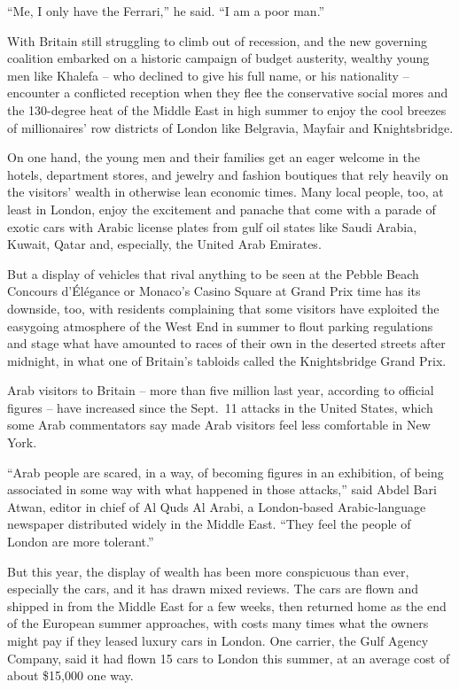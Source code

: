 ﻿\documentclass[12pt]{article}
\begin{document}
``Me, I only have the Ferrari,'' he said. ``I am a poor man.''

With Britain still struggling to climb out of recession, and the new governing coalition embarked on
a historic campaign of budget austerity, wealthy young men like Khalefa -- who declined to give his
full name, or his nationality -- encounter a conflicted reception when they flee the conservative
social mores and the 130-degree heat of the Middle East in high summer to enjoy the cool breezes of
millionaires' row districts of London like Belgravia, Mayfair and Knightsbridge.

On one hand, the young men and their families get an eager welcome in the hotels, department stores,
and jewelry and fashion boutiques that rely heavily on the visitors' wealth in otherwise lean
economic times. Many local people, too, at least in London, enjoy the excitement and panache that
come with a parade of exotic cars with Arabic license plates from gulf oil states like Saudi Arabia,
Kuwait, Qatar and, especially, the United Arab Emirates.

But a display of vehicles that rival anything to be seen at the Pebble Beach Concours d'Él\'egance
or Monaco's Casino Square at Grand Prix time has its downside, too, with residents complaining that
some visitors have exploited the easygoing atmosphere of the West End in summer to flout parking
regulations and stage what have amounted to races of their own in the deserted streets after
midnight, in what one of Britain's tabloids called the Knightsbridge Grand Prix.

Arab visitors to Britain -- more than five million last year, according to official figures -- have
increased since the Sept.~11 attacks in the United States, which some Arab commentators say made
Arab visitors feel less comfortable in New York.

``Arab people are scared, in a way, of becoming figures in an exhibition, of being associated in
some way with what happened in those attacks,'' said Abdel Bari Atwan, editor in chief of Al Quds Al
Arabi, a London-based Arabic-language newspaper distributed widely in the Middle East. ``They feel
the people of London are more tolerant.''

But this year, the display of wealth has been more conspicuous than ever, especially the cars, and
it has drawn mixed reviews. The cars are flown and shipped in from the Middle East for a few weeks,
then returned home as the end of the European summer approaches, with costs many times what the
owners might pay if they leased luxury cars in London. One carrier, the Gulf Agency Company, said it
had flown 15 cars to London this summer, at an average cost of about \$15,000 one way.
\end{document}
